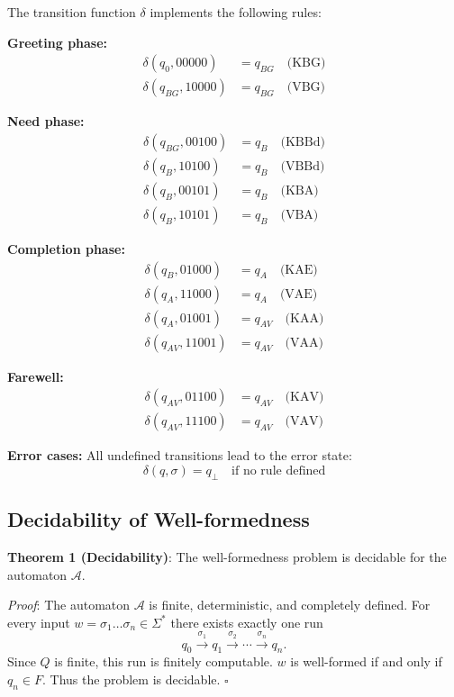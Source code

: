\documentclass[
  12pt,
  a4paper,
  oneside,
  titlepage
]{article}
\begin{document}
The transition function \(\delta\) implements the following rules:

\textbf{Greeting phase:}
\begin{align*}
\delta(q_0, 00000) &= q_{BG} \quad \text{(KBG)} \\
\delta(q_{BG}, 10000) &= q_{BG} \quad \text{(VBG)}
\end{align*}

\textbf{Need phase:}
\begin{align*}
\delta(q_{BG}, 00100) &= q_B \quad \text{(KBBd)} \\
\delta(q_B, 10100) &= q_B \quad \text{(VBBd)} \\
\delta(q_B, 00101) &= q_B \quad \text{(KBA)} \\
\delta(q_B, 10101) &= q_B \quad \text{(VBA)}
\end{align*}

\textbf{Completion phase:}
\begin{align*}
\delta(q_B, 01000) &= q_A \quad \text{(KAE)} \\
\delta(q_A, 11000) &= q_A \quad \text{(VAE)} \\
\delta(q_A, 01001) &= q_{AV} \quad \text{(KAA)} \\
\delta(q_{AV}, 11001) &= q_{AV} \quad \text{(VAA)}
\end{align*}

\textbf{Farewell:}
\begin{align*}
\delta(q_{AV}, 01100) &= q_{AV} \quad \text{(KAV)} \\
\delta(q_{AV}, 11100) &= q_{AV} \quad \text{(VAV)}
\end{align*}

\textbf{Error cases:}
All undefined transitions lead to the error state:
\[
\delta(q, \sigma) = q_\bot \quad \text{if no rule defined}
\]

\subsection{Decidability of Well-formedness}

\textbf{Theorem 1 (Decidability)}: 
The well-formedness problem is decidable for the automaton \(\mathcal{A}\).

\textit{Proof}: The automaton \(\mathcal{A}\) is finite, deterministic, and 
completely defined. For every input \(w = \sigma_1 \ldots \sigma_n \in \Sigma^*\) 
there exists exactly one run
\[
q_0 \xrightarrow{\sigma_1} q_1 \xrightarrow{\sigma_2} \cdots \xrightarrow{\sigma_n} q_n.
\]
Since \(Q\) is finite, this run is finitely computable. 
\(w\) is well-formed if and only if \(q_n \in F\). 
Thus the problem is decidable. \(\square\)
\end{document}
